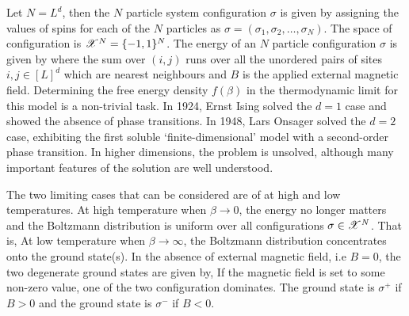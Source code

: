 \documentclass[letterpaper,english,10pt]{article}
\begin{document}
Let $N = L^d$, then the $N$ particle system configuration $\sigma$ is given by assigning the values of spins  for each of the $N$ particles as $\sigma = (\sigma_1, \sigma_2, \dots, \sigma_N)$. 
The space of configuration is $\mathscr{X}^N = \{-1,1\}^N$. 
The energy of an $N$ particle configuration $\sigma$ is given by
where the sum over $(i,j)$ runs over all the unordered pairs of sites $i,j \in [L]^d$ which are nearest neighbours and $B$ is the applied external magnetic field. 
Determining the free energy density $f(\beta)$ in the thermodynamic limit for this model is a non-trivial task. In 1924, Ernst Ising solved the $d=1$ case and showed the absence of phase transitions. 
In 1948, Lars Onsager solved the $d=2$ case, exhibiting the first soluble `finite-dimensional' model with a second-order phase transition. 
In higher dimensions, the problem is unsolved, although many important features of the solution are well understood.

The two limiting cases that can be considered are of at high and low temperatures. 
At high temperature when $\beta \to 0$, the energy no longer matters and the Boltzmann distribution is uniform over all configurations $\sigma \in \mathscr{X}^N$. 
That is, 
At low temperature when $\beta \to \infty$, 
the Boltzmann distribution concentrates onto the ground state(s). 
In the absence of external magnetic field, i.e $B=0$, the two degenerate ground states are given by,
If the magnetic field is set to some non-zero value, one of the two configuration dominates. 
The ground state is $\sigma^+$ if $B>0$ and the ground state is $\sigma^-$ if $B<0$.
\end{document}
